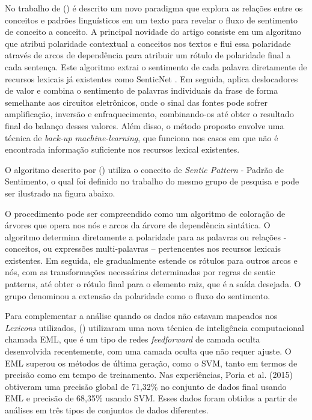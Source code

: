 \documentclass[
	12pt,				%
	openright,			%
	oneside,			%
	a4paper,			%
	english,			%
	spanish,			%
	brazil				%
	]{abntex2}
\begin{document}
	No trabalho de  (\citeyear{article_sentiment_analysis}) é descrito um novo paradigma que explora as relações entre os conceitos e padrões linguísticos em um texto para revelar o fluxo de sentimento de conceito a conceito. A principal novidade do artigo consiste em um algoritmo que atribui polaridade contextual a conceitos nos textos e flui essa polaridade através de arcos de dependência para atribuir um rótulo de polaridade final a cada sentença. Este algoritmo extrai o sentimento de cada palavra diretamente de recursos lexicais já existentes como SenticNet  \cite{Cambria2014}. Em seguida, aplica deslocadores de valor e combina o sentimento de palavras individuais da frase de forma semelhante aos circuitos eletrônicos, onde o sinal das fontes pode sofrer amplificação, inversão e enfraquecimento, combinando-os até obter o resultado final do balanço desses valores. Além disso, o método proposto envolve uma técnica de \emph{back-up machine-learning}, que funciona nos casos em que não é encontrada informação suficiente nos recursos lexical existentes.

 	O algoritmo descrito por  (\citeyear{article_sentiment_analysis}) utiliza o conceito de \emph{Sentic Pattern} - Padrão de Sentimento, o qual foi definido no trabalho do mesmo grupo de pesquisa \cite{article_Poria2014} e pode ser ilustrado na figura abaixo. %

O procedimento pode ser compreendido como um algoritmo de coloração de árvores que opera nos nós e arcos da árvore de dependência sintática. O algoritmo determina diretamente a polaridade para as palavras ou relações - conceitos, ou expressões multi-palavras – pertencentes nos recursos lexicais existentes. Em seguida, ele gradualmente estende os rótulos para outros arcos e nós, com as transformações necessárias determinadas por regras de sentic patterns, até obter o rótulo final para o elemento raiz, que é a saída desejada. O grupo denominou a extensão da polaridade como o fluxo do sentimento.

Para complementar a análise quando os dados não estavam mapeados nos \emph{Lexicons} utilizados,  (\citeyear{article_sentiment_analysis}) utilizaram uma nova técnica de inteligência computacional chamada \gls{EML}, que é um tipo de redes \emph{feedforward} de camada oculta desenvolvida recentemente, com uma camada oculta que não requer ajuste. O \gls{EML} superou os métodos de última geração, como o \gls{SVM}, tanto em termos de precisão como em tempo de treinamento. Nas experiências, Poria et al. (2015) obtiveram uma precisão global de 71,32\% no conjunto de dados final usando \gls{EML} e precisão de 68,35\% usando \gls{SVM}. Esses dados foram obtidos a partir de análises em três tipos de conjuntos de dados diferentes.
\end{document}
